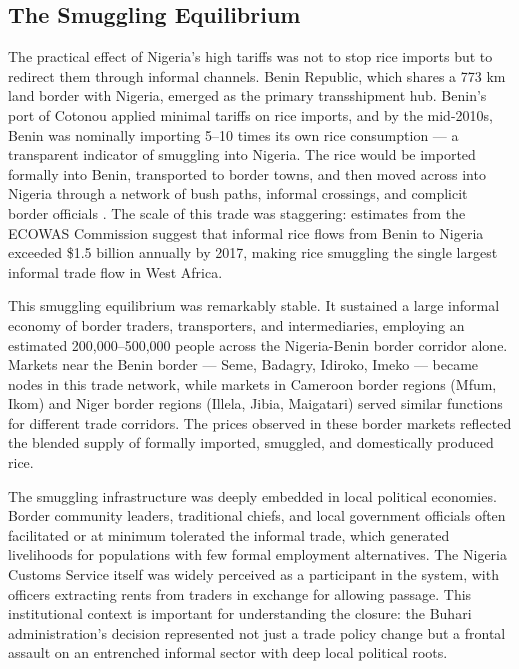 \documentclass[12pt]{article}
\begin{document}
\subsection{The Smuggling Equilibrium}

The practical effect of Nigeria's high tariffs was not to stop rice imports but to redirect them through informal channels. Benin Republic, which shares a 773 km land border with Nigeria, emerged as the primary transshipment hub. Benin's port of Cotonou applied minimal tariffs on rice imports, and by the mid-2010s, Benin was nominally importing 5--10 times its own rice consumption --- a transparent indicator of smuggling into Nigeria. The rice would be imported formally into Benin, transported to border towns, and then moved across into Nigeria through a network of bush paths, informal crossings, and complicit border officials \citep{okonjo2020nigeria}. The scale of this trade was staggering: estimates from the ECOWAS Commission suggest that informal rice flows from Benin to Nigeria exceeded \$1.5 billion annually by 2017, making rice smuggling the single largest informal trade flow in West Africa.

This smuggling equilibrium was remarkably stable. It sustained a large informal economy of border traders, transporters, and intermediaries, employing an estimated 200,000--500,000 people across the Nigeria-Benin border corridor alone. Markets near the Benin border --- Seme, Badagry, Idiroko, Imeko --- became nodes in this trade network, while markets in Cameroon border regions (Mfum, Ikom) and Niger border regions (Illela, Jibia, Maigatari) served similar functions for different trade corridors. The prices observed in these border markets reflected the blended supply of formally imported, smuggled, and domestically produced rice.

The smuggling infrastructure was deeply embedded in local political economies. Border community leaders, traditional chiefs, and local government officials often facilitated or at minimum tolerated the informal trade, which generated livelihoods for populations with few formal employment alternatives. The Nigeria Customs Service itself was widely perceived as a participant in the system, with officers extracting rents from traders in exchange for allowing passage. This institutional context is important for understanding the closure: the Buhari administration's decision represented not just a trade policy change but a frontal assault on an entrenched informal sector with deep local political roots.
\end{document}
